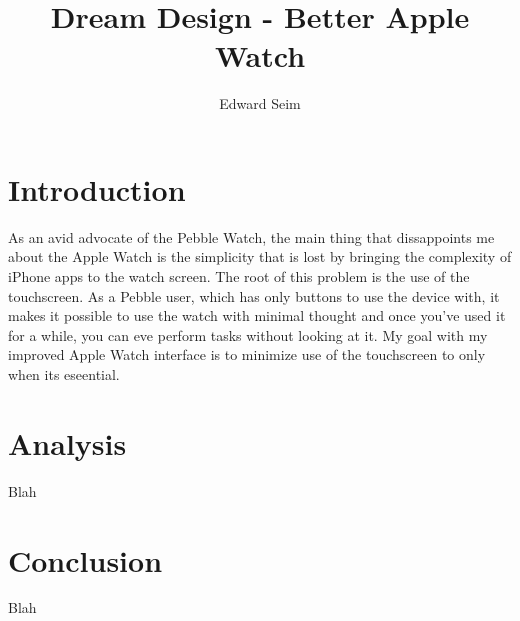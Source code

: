 \documentclass[journal,letterpaper]{article}
\title{Dream Design - Better Apple Watch}
\author{Edward Seim}
\begin{document}
    \maketitle
    
    \section{Introduction}
    \label{Introduction}

    As an avid advocate of the Pebble Watch, the main thing that dissappoints me about the Apple Watch is the simplicity that is lost by bringing the complexity of iPhone apps to the watch screen. The root of this problem is the use of the touchscreen. As a Pebble user, which has only buttons to use the device with, it makes it possible to use the watch with minimal thought and once you've used it for a while, you can eve perform tasks without looking at it. My goal with my improved Apple Watch interface is to minimize use of the touchscreen to only when its eseential. 

    \section{Analysis}
    \label{Analysis}

    Blah

    \section{Conclusion}
    \label{Conclusion}

    Blah
\end{document}
